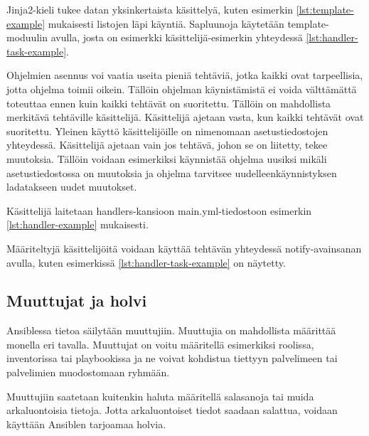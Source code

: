 

Jinja2-kieli tukee datan yksinkertaista käsittelyä, kuten esimerkin
\ref{lst:template-example} mukaisesti listojen läpi käyntiä. Sapluunoja
käytetään template-moduulin avulla, josta on esimerkki käsittelijä-esimerkin
yhteydessä \ref{lst:handler-task-example}. \parencite{AnsibleDocs}

Ohjelmien asennus voi vaatia useita pieniä tehtäviä, jotka kaikki ovat
tarpeellisia, jotta ohjelma toimii oikein. Tällöin ohjelman käynistämistä ei
voida välttämättä toteuttaa ennen kuin kaikki tehtävät on suoritettu.
Tällöin on mahdollista merkitävä tehtäville käsittelijä. Käsittelijä ajetaan
vasta, kun kaikki tehtävät ovat suoritettu. Yleinen käyttö käsittelijöille
on nimenomaan asetustiedostojen yhteydessä. Käsittelijä ajetaan vain jos
tehtävä, johon se on liitetty, tekee muutoksia. Tällöin voidaan esimerkiksi
käynnistää ohjelma uusiksi mikäli asetustiedostossa on muutoksia ja ohjelma
tarvitsee uudelleenkäynnistyksen ladatakseen uudet muutokset.
\parencite{JamesFreeman2020PA2}

Käsittelijä laitetaan handlers-kansioon main.yml-tiedostoon esimerkin
\ref{lst:handler-example} mukaisesti.



Määriteltyjä käsittelijöitä voidaan käyttää tehtävän yhteydessä notify-avainsanan
avulla, kuten esimerkissä \ref{lst:handler-task-example} on näytetty.



\subsection{Muuttujat ja holvi}

Ansiblessa tietoa säilytään muuttujiin. Muuttujia on mahdollista määrittää monella
eri tavalla. Muuttujat on voitu määritellä esimerkiksi roolissa, inventorissa
tai playbookissa ja ne voivat kohdistua tiettyyn palvelimeen tai palvelimien
muodostomaan ryhmään. \parencite{JamesFreeman2020PA2}

Muuttujiin saatetaan kuitenkin haluta määritellä salasanoja tai muida arkaluontoisia
tietoja. Jotta arkaluontoiset tiedot saadaan salattua, voidaan käyttään Ansiblen
tarjoamaa holvia. \parencite{JamesFreeman2020PA2}

